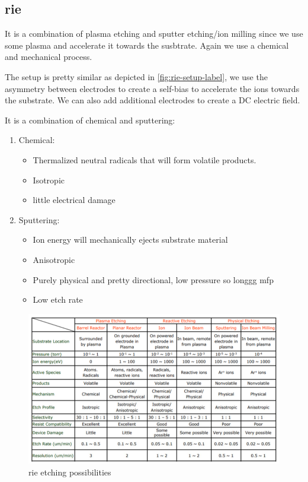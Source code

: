 \documentclass{report}
\begin{document}
\subsection{\gls{rie}}

It is a combination of plasma etching and sputter etching/ion milling since we use some plasma and accelerate it towards the susbtrate. Again we use a chemical and mechanical process. 

The setup is pretty similar as depicted in \ref{fig:rie-setup-label}, we use the asymmetry between electrodes to create a self-bias to accelerate the ions towards the substrate. We can also add additional electrodes to create a DC electric field.

It is a combination of chemical and sputtering:

\begin{enumerate}
    \item Chemical:
    \begin{itemize}
        \item Thermalized neutral radicals that will form volatile products.
        \item Isotropic
        \item little electrical damage
    \end{itemize}
    \item Sputtering:
    \begin{itemize}
        \item Ion energy will mechanically ejects substrate material
        \item Anisotropic
        \item Purely physical and pretty directional, low pressure so longgg \gls{mfp}
        \item Low etch rate
    \end{itemize}
\end{enumerate}

\begin{figure}[H]
    \centering
    \includegraphics[width=0.75\linewidth]{rie_etching_possibilities.png}
    \caption{\gls{rie} etching possibilities}
    \label{fig:enter-label}
\end{figure}
\end{document}
